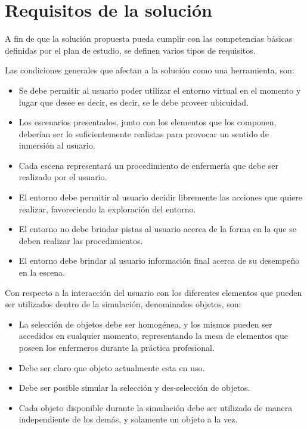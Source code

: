 \section{Requisitos de la solución}
\label{sec:requisitos}

A fin de que la solución propuesta pueda cumplir con las competencias básicas
definidas por el plan de estudio, se definen varios tipos de requisitos.

Las condiciones generales que afectan a la solución como una herramienta, son:

\begin{itemize}
\item Se debe permitir al usuario poder utilizar el entorno virtual en el
    momento y lugar que desee es decir, es decir, se le debe proveer ubicuidad.

\item Los escenarios presentados, junto con los elementos que los componen,
    deberían ser lo suficientemente realistas para provocar un sentido de
    inmersión al usuario.

\item Cada escena representará un procedimiento de enfermería que debe ser
    realizado por el usuario.

\item El entorno debe permitir al usuario decidir libremente las acciones que
    quiere realizar, favoreciendo la exploración del entorno.

\item El entorno no debe brindar pistas al usuario acerca de la forma en la que
    se deben realizar las procedimientos.

\item El entorno debe brindar al usuario información final acerca de su
    desempeño en la escena.


\end{itemize}

Con respecto a la interacción del usuario con los diferentes elementos que
pueden ser utilizados dentro de la simulación, denominados objetos, son:

\begin{itemize}

\item La selección de objetos debe ser homogénea, y los mismos pueden ser
    accedidos en cualquier momento, representando la mesa de elementos que
    poseen los enfermeros durante la práctica profesional.

\item Debe ser claro que objeto actualmente esta en uso.

\item Debe ser posible simular la selección y des-selección de objetos.

\item Cada objeto disponible durante la simulación debe ser utilizado de
    manera independiente de los demás, y solamente un objeto a la vez.

\end{itemize}

